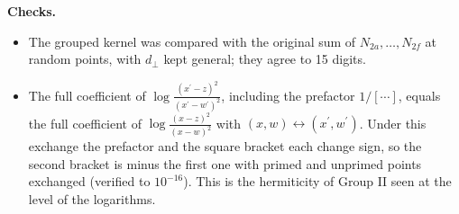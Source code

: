 \documentclass[10pt]{article}
\begin{document}
\noindent\textbf{Checks.}
\begin{itemize}
\item The grouped kernel was compared with the original sum of $N_{2a},\dots,N_{2f}$ at random points, with $d_{\perp}$ kept general; they agree to 15 digits.
\item The full coefficient of $\log\frac{(x^{\prime}-z)^{2}}{(x^{\prime}-w^{\prime})^{2}}$, including the prefactor $1/[\cdots]$, equals the full coefficient of $\log\frac{(x-z)^{2}}{(x-w)^{2}}$ with $(x,w)\leftrightarrow(x^{\prime},w^{\prime})$. Under this exchange the prefactor and the square bracket each change sign, so the second bracket is minus the first one with primed and unprimed points exchanged (verified to $10^{-16}$). This is the hermiticity of Group II seen at the level of the logarithms.
\end{itemize}
\end{document}
